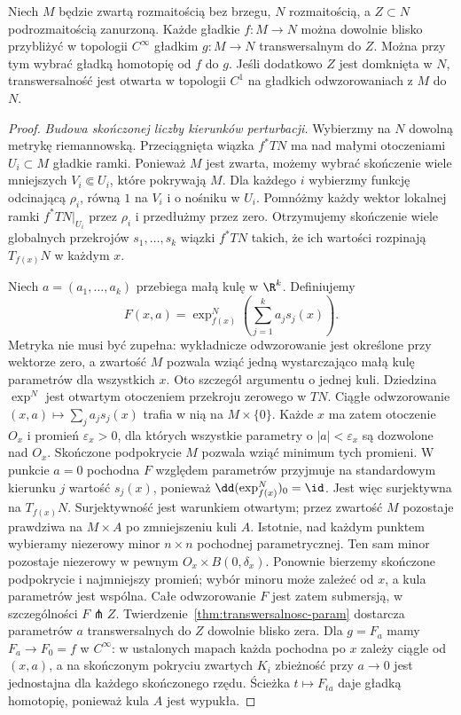 \begin{twierdzenie}
\label{thm:gestosc-transwersalnych}
Niech $M$ będzie zwartą rozmaitością bez brzegu,
$N$ rozmaitością, a $Z\subset N$ podrozmaitością
zanurzoną. Każde gładkie $f:M\to N$ można
dowolnie blisko przybliżyć w topologii $C^\infty$
gładkim $g:M\to N$ transwersalnym do $Z$.
Można przy tym wybrać gładką homotopię
od $f$ do $g$.
Jeśli dodatkowo $Z$ jest domknięta w $N$,
transwersalność jest otwarta w topologii $C^1$
na gładkich odwzorowaniach z $M$ do $N$.
\end{twierdzenie}
\begin{proof}
\emph{Budowa skończonej liczby kierunków perturbacji.}
Wybierzmy na $N$ dowolną metrykę riemannowską.
Przeciągnięta wiązka $f^*TN$ ma nad małymi
otoczeniami $U_i\subset M$ gładkie ramki.
Ponieważ $M$ jest zwarta, możemy wybrać skończenie
wiele mniejszych $V_i\Subset U_i$, które pokrywają
$M$. Dla każdego $i$ wybierzmy funkcję odcinającą
$\rho_i$, równą $1$ na $V_i$ i o nośniku w $U_i$.
Pomnóżmy każdy wektor lokalnej ramki $f^*TN|_{U_i}$
przez $\rho_i$ i przedłużmy przez zero. Otrzymujemy
skończenie wiele globalnych przekrojów
$s_1,\ldots,s_k$ wiązki $f^*TN$ takich, że
ich wartości rozpinają $T_{f(x)}N$ w każdym $x$.

Niech $a=(a_1,\ldots,a_k)$ przebiega małą kulę
w $\R^k$. Definiujemy
\[
 F(x,a)=\exp^N_{f(x)}
              \left(\sum_{j=1}^k a_js_j(x)\right).
\]
Metryka nie musi być zupełna: wykładnicze
odwzorowanie jest określone przy wektorze zero,
a zwartość $M$ pozwala wziąć jedną wystarczająco
małą kulę parametrów dla wszystkich $x$.
Oto szczegół argumentu o jednej kuli.
Dziedzina $\exp^N$ jest otwartym otoczeniem przekroju zerowego
w $TN$. Ciągłe odwzorowanie
$(x,a)\mapsto\sum_j a_js_j(x)$ trafia w nią na $M\times\{0\}$.
Każde $x$ ma zatem otoczenie $O_x$ i promień $\varepsilon_x>0$,
dla których wszystkie parametry o $|a|<\varepsilon_x$
są dozwolone nad $O_x$.
Skończone podpokrycie $M$ pozwala wziąć minimum tych promieni.
W punkcie $a=0$ pochodna $F$ względem parametrów
przyjmuje na standardowym kierunku $j$ wartość
$s_j(x)$, ponieważ $\dd(\exp^N_{f(x)})_0=\id$.
Jest więc surjektywna na $T_{f(x)}N$.
Surjektywność jest warunkiem otwartym;
przez zwartość $M$ pozostaje prawdziwa na
$M\times A$ po zmniejszeniu kuli $A$.
Istotnie, nad każdym punktem wybieramy niezerowy minor
$n\times n$ pochodnej parametrycznej.
Ten sam minor pozostaje niezerowy w pewnym
$O_x\times B(0,\delta_x)$.
Ponownie bierzemy skończone podpokrycie i najmniejszy promień;
wybór minoru może zależeć od $x$, a kula parametrów jest wspólna.
Całe odwzorowanie $F$ jest zatem submersją,
w szczególności $F\pitchfork Z$.
Twierdzenie~\ref{thm:transwersalnosc-param}
dostarcza parametrów $a$ transwersalnych do
$Z$ dowolnie blisko zera. Dla
$g=F_a$ mamy $F_a\to F_0=f$ w $C^\infty$:
w ustalonych mapach każda pochodna po $x$ zależy
ciągle od $(x,a)$, a na skończonym pokryciu zwartych
$K_i$ zbieżność przy $a\to0$ jest jednostajna dla każdego
skończonego rzędu. Ścieżka $t\mapsto F_{ta}$ daje
gładką homotopię, ponieważ kula $A$ jest wypukła.


\end{proof}
